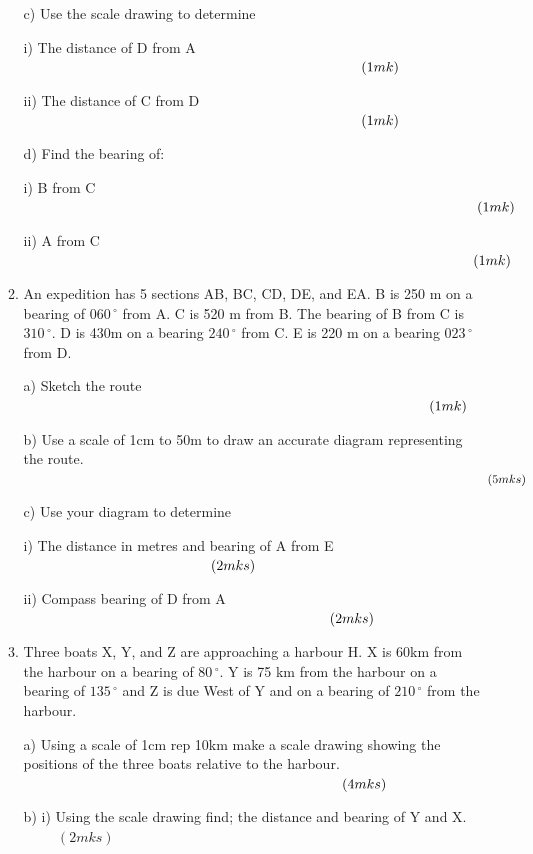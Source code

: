 \documentclass[
  a4paperpaper,
]{scrbook}
\begin{document}
\begin{enumerate}
\begin{tcolorbox}
\begin{enumerate}
    c) Use the scale drawing to determine

    i) The distance of D from A \(\hspace{8.5cm} (1mk)\)

    ii) The distance of C from D \(\hspace{8.5cm} (1mk)\)

    d) Find the bearing of:

    i) B from C \(\hspace{11.4cm} (1mk)\)

    ii) A from C \(\hspace{11.3cm} (1mk)\)
  \item
    An expedition has 5 sections AB, BC, CD, DE, and EA. B is 250 m on a
    bearing of \(060\,^{\circ}\) from A. C is 520 m from B. The bearing
    of B from C is \(310\,^{\circ}\). D is 430m on a bearing
    \(240\,^{\circ}\) from C. E is 220 m on a bearing \(023\,^{\circ}\)
    from D.

    a) Sketch the route \(\hspace{10.2cm} (1mk)\)

    b) Use a scale of 1cm to 50m to draw an accurate diagram
    representing the route. \(\hspace{13.4cm} (5mks)\)

    c) Use your diagram to determine

    i) The distance in metres and bearing of A from E
    \(\hspace{4.7cm} (2mks)\)

    ii) Compass bearing of D from A \(\hspace{7.7cm} (2mks)\)
  \item
    Three boats X, Y, and Z are approaching a harbour H. X is 60km from
    the harbour on a bearing of \(80\,^{\circ}\). Y is 75 km from the
    harbour on a bearing of \(135\,^{\circ}\) and Z is due West of Y and
    on a bearing of \(210\,^{\circ}\) from the harbour.

    a) Using a scale of 1cm rep 10km make a scale drawing showing the
    positions of the three boats relative to the harbour.
    \(\hspace{8.0cm} (4mks)\)

    b) i) Using the scale drawing find; the distance and bearing of Y
    and X. \(\hspace{1cm} (2mks)\)


\end{enumerate}
\end{tcolorbox}
\end{enumerate}
\end{document}
